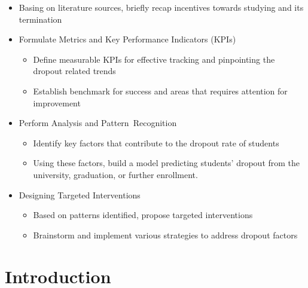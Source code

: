 \documentclass[
  letterpaper,
  DIV=11,
  numbers=noendperiod]{scrartcl}
\providecommand{\tightlist}{%
  \setlength{\itemsep}{0pt}\setlength{\parskip}{0pt}}\usepackage{longtable,booktabs,array}
\begin{document}
\begin{itemize}
\tightlist
\item
  Basing on literature sources, briefly recap incentives towards
  studying and its termination
\item
  Formulate Metrics and Key Performance Indicators (KPIs)

  \begin{itemize}
  \tightlist
  \item
    Define measurable KPIs for effective tracking and pinpointing the
    dropout related trends
  \item
    Establish benchmark for success and areas that requires attention
    for improvement
  \end{itemize}
\item
  Perform Analysis and Pattern~Recognition

  \begin{itemize}
  \tightlist
  \item
    Identify key factors that contribute to the dropout rate of students
  \item
    Using these factors, build a model predicting students' dropout from
    the university, graduation, or further enrollment.
  \end{itemize}
\item
  Designing Targeted Interventions

  \begin{itemize}
  \tightlist
  \item
    Based on patterns identified, propose targeted interventions
  \item
    Brainstorm and implement various strategies to address dropout
    factors
  \end{itemize}
\end{itemize}

\hypertarget{introduction}{%
\section{Introduction}\label{introduction}}
\end{document}
